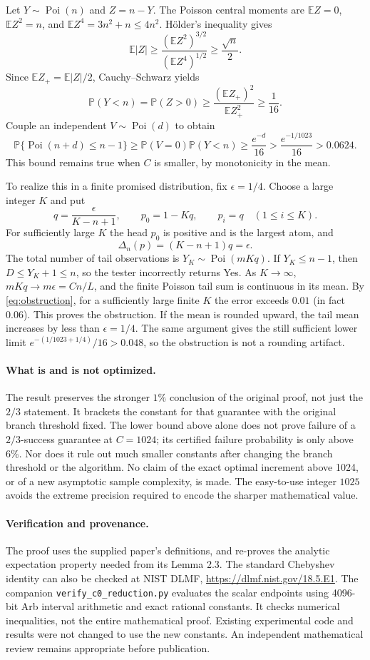 \documentclass[11pt]{article}
\newcommand{\E}{\mathbb E}
\newcommand{\Prb}{\mathbb P}
\newcommand{\Poi}{\operatorname{Poi}}
\begin{document}
Let $Y\sim\Poi(n)$ and $Z=n-Y$. The Poisson central moments are
$\E Z=0$, $\E Z^2=n$, and $\E Z^4=3n^2+n\le4n^2$.
H\"older's inequality gives
\[
 \E|Z|\ge\frac{(\E Z^2)^{3/2}}{(\E Z^4)^{1/2}}\ge\frac{\sqrt n}{2}.
\]
Since $\E Z_+=\E|Z|/2$, Cauchy--Schwarz yields
\[
 \Prb(Y<n)=\Prb(Z>0)
 \ge\frac{(\E Z_+)^2}{\E Z_+^2}\ge\frac1{16}.
\]
Couple an independent $V\sim\Poi(d)$ to obtain
\begin{equation}
 \Prb\{\Poi(n+d)\le n-1\}
 \ge\Prb(V=0)\Prb(Y<n)
 \ge\frac{e^{-d}}{16}>\frac{e^{-1/1023}}{16}>0.0624.
 \label{eq:obstruction}
\end{equation}
This bound remains true when $C$ is smaller, by monotonicity in the mean.

To realize this in a finite promised distribution, fix $\epsilon=1/4$.
Choose a large integer $K$ and put
\[
 q=\frac{\epsilon}{K-n+1},\qquad
 p_0=1-Kq,\qquad p_i=q\quad(1\le i\le K).
\]
For sufficiently large $K$ the head $p_0$ is positive and is the largest
atom, and
\[
 \Delta_n(p)=(K-n+1)q=\epsilon.
\]
The total number of tail observations is $Y_K\sim\Poi(mKq)$. If
$Y_K\le n-1$, then $D\le Y_K+1\le n$, so the tester incorrectly returns
Yes. As $K\to\infty$, $mKq\to m\epsilon=Cn/L$, and the finite Poisson
tail sum is continuous in its mean. By \eqref{eq:obstruction}, for a
sufficiently large finite $K$ the error exceeds $0.01$ (in fact $0.06$).
This proves the obstruction.
If the mean is rounded upward, the tail mean increases by less than
$\epsilon=1/4$. The same argument gives the still sufficient lower limit
$e^{-(1/1023+1/4)}/16>0.048$, so the obstruction is not a rounding artifact.

\paragraph{What is and is not optimized.}
The result preserves the stronger $1\%$ conclusion of the original proof,
not just the $2/3$ statement. It brackets the constant for that guarantee
with the original branch threshold fixed. The lower bound above alone does
not prove failure of a $2/3$-success guarantee at $C=1024$; its certified
failure probability is only above $6\%$. Nor does it rule out much smaller
constants after changing the branch threshold or the algorithm. No claim
of the exact optimal increment above 1024, or of a new asymptotic sample
complexity, is made. The easy-to-use integer $1025$ avoids the extreme
precision required to encode the sharper mathematical value.

\paragraph{Verification and provenance.}
The proof uses the supplied paper's definitions, and re-proves the analytic
expectation property needed from its Lemma 2.3. The standard Chebyshev
identity can also be checked at NIST DLMF,
\url{https://dlmf.nist.gov/18.5.E1}. The companion
\texttt{verify\_c0\_reduction.py} evaluates the scalar endpoints using
4096-bit Arb interval arithmetic and exact rational constants. It checks
numerical inequalities, not the entire mathematical proof. Existing
experimental code and results were not changed to use the new constants.
An independent mathematical review remains appropriate before publication.
\end{document}
